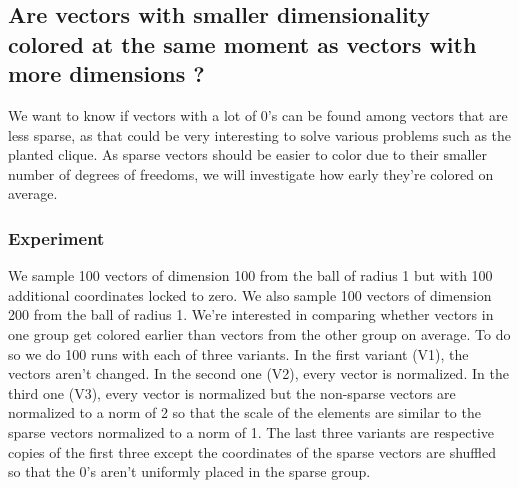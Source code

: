 \documentclass[12pt]{article}
\begin{document}
\subsection{Are vectors with smaller dimensionality colored at the same moment as vectors with more dimensions ?}\label{smaller_dimensionality}
We want to know if vectors with a lot of 0's can be found among vectors that are less sparse, as that could be very interesting to solve various problems such as the planted clique. As sparse vectors should be easier to color due to their smaller number of degrees of freedoms, we will investigate how early they're colored on average.

\subsubsection{Experiment}
We sample 100 vectors of dimension 100 from the ball of radius 1 but with 100 additional coordinates locked to zero. We also sample 100 vectors of dimension 200 from the ball of radius 1. We're interested in comparing whether vectors in one group get colored earlier than vectors from the other group on average. To do so we do 100 runs with each of three variants. In the first variant (V1), the vectors aren't changed. In the second one (V2), every vector is normalized. In the third one (V3), every vector is normalized but the non-sparse vectors are normalized to a norm of 2 so that the scale of the elements are similar to the sparse vectors normalized to a norm of 1. The last three variants are respective copies of the first three except the coordinates of the sparse vectors are shuffled so that the 0's aren't uniformly placed in the sparse group.
\end{document}
